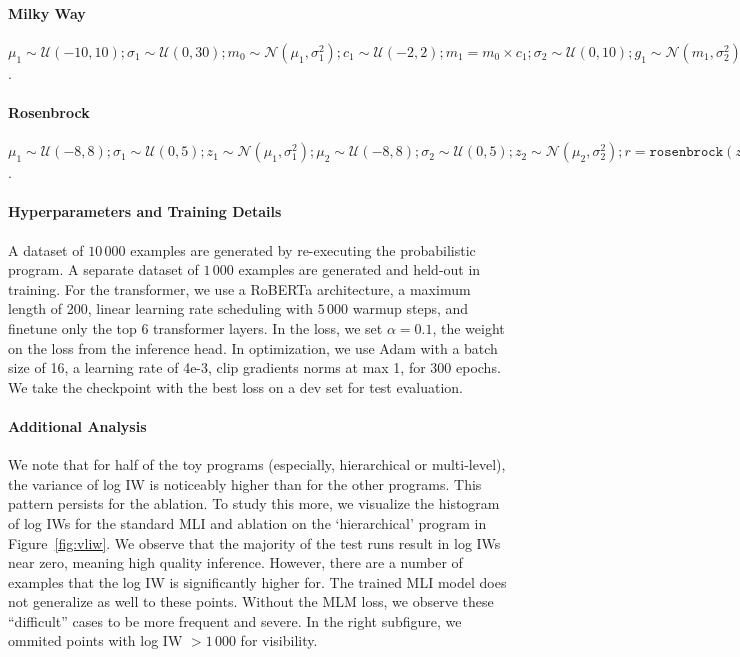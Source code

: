 \paragraph{Milky Way} $\mu_1 \sim \mathcal{U}(-10, 10); \sigma_1 \sim \mathcal{U}(0, 30); m_0 \sim \mathcal{N}(\mu_1, \sigma^2_1); c_1 \sim \mathcal{U}(-2, 2); m_1 = m_0 \times c_1; \sigma_2 \sim \mathcal{U}(0, 10); g_1 \sim \mathcal{N}(m_1, \sigma^2_2); c_2 \sim \mathcal{U}(-5, 5); m_2 = m_0 + c_2; \sigma_3 \sim \mathcal{U}(0, 10); g_2 \sim \mathcal{N}(m_2, \sigma^2_3); \sigma_4 \sim \mathcal{U}(0.5, 10); z_1 \sim \mathcal{N}(g_1, \sigma^2_4); \sigma_5 \sim \mathcal{U}(0.5, 10); z_1 \sim \mathcal{N}(g_2, \sigma^2_5)$.

\paragraph{Rosenbrock} $\mu_1 \sim \mathcal{U}(-8, 8); \sigma_1 \sim \mathcal{U}(0, 5); z_1 \sim \mathcal{N}(\mu_1, \sigma^2_1); \mu_2 \sim \mathcal{U}(-8, 8); \sigma_2 \sim \mathcal{U}(0, 5); z_2 \sim \mathcal{N}(\mu_2, \sigma^2_2); r = \texttt{rosenbrock}(z_1, z_2); \sigma_3 \sim \mathcal{U}(0.5, 10); z_3 \sim \mathcal{N}(r, \sigma^2_3)$.

\paragraph{Hyperparameters and Training Details} A dataset of $10\,000$ examples are generated by re-executing the probabilistic program. A separate dataset of $1\,000$ examples are generated and held-out in training. For the transformer, we use a RoBERTa
\cite{liu2019roberta} architecture, a maximum length of 200, linear learning rate scheduling with $5\,000$ warmup steps, and finetune only the top 6 transformer layers. In the loss, we set $\alpha = 0.1$, the weight on the loss from the inference head. In optimization, we use Adam \cite{kingma2014adam} with a batch size of 16, a learning rate of 4e-3, clip gradients norms at max 1, for 300 epochs. We take the checkpoint with the best loss on a dev set for test evaluation.

\paragraph{Additional Analysis}

We note that for half of the toy programs (especially, hierarchical or multi-level), the variance of log IW is noticeably higher than for the other programs. This pattern persists for the ablation. To study this more, we visualize the histogram of log IWs for the standard MLI and ablation on the `hierarchical' program in Figure~\ref{fig:vliw}. We observe that the majority of the test runs result in log IWs near zero, meaning high quality inference. However, there are a number of examples that the log IW is significantly higher for. The trained MLI model does not generalize as well to these points. Without the MLM loss, we observe these ``difficult'' cases to be more frequent and severe. In the right subfigure, we ommited points with log IW $>1\,000$ for visibility.

